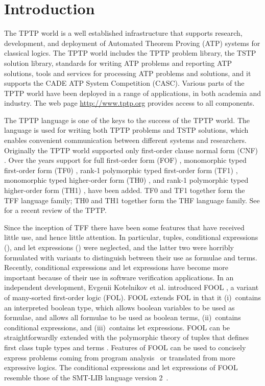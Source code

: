 
\section{Introduction}
\label{sec:tfx/Introduction}

The TPTP world \cite{Sut10} is a well established infrastructure that supports
research, development, and deployment of Automated Theorem Proving (ATP)
systems for classical logics.
The TPTP world includes the TPTP problem library,
the TSTP solution library,
standards for writing ATP problems and reporting ATP solutions,
tools and services for processing ATP problems and solutions,
and it supports the CADE ATP System Competition (CASC).
Various parts of the TPTP world have been deployed in a range of applications,
in both academia and industry.
The web page \url{http://www.tptp.org} provides access to all components.

The TPTP language is one of the keys to the success of the TPTP world.
The language is used for writing both TPTP problems and TSTP solutions,
which enables convenient communication between different systems and
researchers.
Originally the TPTP world supported only first-order clause normal form (CNF)
\cite{SS98-JAR}.
Over the years support for full first-order form (FOF) \cite{Sut09},
monomorphic typed first-order form (TF0) \cite{tff0}, rank-1 polymorphic
typed first-order form (TF1) \cite{tff1}, monomorphic typed higher-order 
form (TH0) \cite{THF}, and rank-1 polymorphic typed higher-order form (TH1) 
\cite{KSR16}, have been added.
TF0 and TF1 together form the TFF language family; TH0 and TH1 together form 
the THF language family.
See \cite{Sut17} for a recent review of the TPTP.

Since the inception of TFF there have been some features that have 
received little use, and hence little attention. 
In particular, tuples, conditional expressions (\ITE), and let 
expressions (\LETIN) were neglected, and the latter two were horribly 
formulated with variants to distinguish between their use as formulae and 
terms. 
Recently, conditional expressions and let expressions have become more 
important because of their use in software verification applications.
In an independent development, Evgenii Kotelnikov et al. introduced FOOL
\cite{FOOL}, a variant of many-sorted first-order logic (FOL).
FOOL extends FOL in that it (i)~contains an interpreted boolean type, which
allows boolean variables to be used as formulae, and allows all formulae to be 
used as boolean terms, (ii)~contains conditional expressions, and 
(iii)~contains let expressions.
FOOL can be straightforwardly extended with the polymorphic theory of tuples 
that defines first class tuple types and terms \cite{KKV18}.
Features of FOOL can be used to concisely express problems coming from program
analysis~\cite{KKV18} or translated from more expressive logics. 
The conditional expressions and let expressions of FOOL resemble those of the 
SMT-LIB language version 2~\cite{SMT-LIB}.


